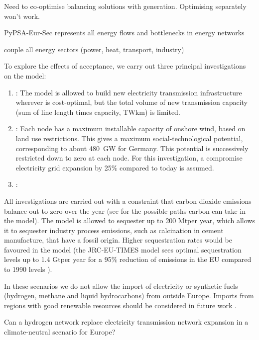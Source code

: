 Need to co-optimise balancing solutions with generation. Optimising separately won't work.

PyPSA-Eur-Sec represents all energy flows and bottlenecks in energy networks

couple all energy sectors (power, heat, transport, industry)

To explore the effects of acceptance, we carry out three principal investigations
on the model:

\begin{enumerate}
\item {}: The model is allowed to build new electricity
transmission infrastructure wherever is cost-optimal, but the total volume of new
transmission capacity (sum of line length times capacity, TWkm) is limited.

\item {}: Each node has a maximum installable capacity of onshore
wind, based on land use restrictions. This gives a maximum social-technological
potential, corresponding to about \SI{480}{\giga\watt} for Germany. This potential is
successively restricted down to zero at each node. For this investigation, a
compromise electricity grid expansion by 25\% compared to today is assumed.

\item {}:
\end{enumerate}

All investigations are carried out with a constraint that carbon dioxide
emissions balance out to zero over the year (see for
the possible paths carbon can take in the model). The model is allowed to
sequester up to 200 Mt\co per year, which allows it to sequester industry
process emissions, such as calcination in cement manufacture, that have a fossil
origin. Higher sequestration rates would be favoured in the model (the
JRC-EU-TIMES model sees optimal sequestration levels up to 1.4 Gt\co per year
for a 95\% reduction of \co emissions in the EU compared to 1990 levels
\cite{blancoPotentialHydrogen2018}).

In these scenarios we do not allow the import of electricity or synthetic fuels
(hydrogen, methane and liquid hydrocarbons) from outside Europe. Imports from
regions with good renewable resources should be considered in future work
\cite{fasihiTechnoeconomicAssessment2019,heuserTechnoeconomicAnalysis2019}.

Can a hydrogen network replace electricity transmission network expansion in a climate-neutral scenario for Europe?

